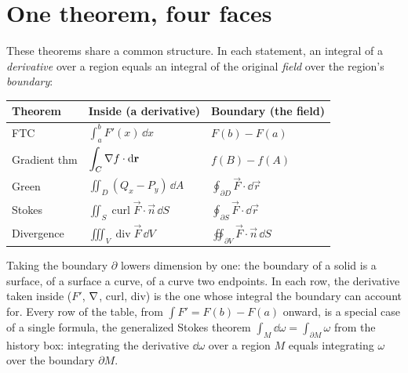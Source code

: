 \section{One theorem, four faces}
\label{ch35:unification}

These theorems share a common structure. In each statement, an integral of a
\emph{derivative} over a region equals an integral of the original \emph{field}
over the region's \emph{boundary}:

\begin{center}
\renewcommand{\arraystretch}{1.6}
\begin{tabular}{@{}lll@{}}
\toprule
\textbf{Theorem} & \textbf{Inside (a derivative)} & \textbf{Boundary (the field)} \\
\midrule
FTC & $\displaystyle\int_a^b F'(x)\,\dd x$ & $F(b)-F(a)$ \\
Gradient thm & $\displaystyle\int_C \nabla f\cdot\mathrm{d}\mathbf{r}$ & $f(B)-f(A)$ \\
Green & $\displaystyle\iint_D (Q_x-P_y)\,\dd A$ & $\displaystyle\oint_{\partial D}\vec F\cdot\dd\vec r$ \\
Stokes & $\displaystyle\iint_S \operatorname{curl}\vec F\cdot\vec n\,\dd S$ & $\displaystyle\oint_{\partial S}\vec F\cdot\dd\vec r$ \\
Divergence & $\displaystyle\iiint_V \operatorname{div}\vec F\,\dd V$ & $\displaystyle\oiint_{\partial V}\vec F\cdot\vec n\,\dd S$ \\
\bottomrule
\end{tabular}
\end{center}

\begin{aestheticbox}
Taking the boundary $\partial$ lowers dimension by one: the boundary of a solid is
a surface, of a surface a curve, of a curve two endpoints. In each row, the
derivative taken inside ($F'$, $\nabla$, curl, div) is the one whose integral the
boundary can account for. Every row of the table, from $\int F' = F(b)-F(a)$
onward, is a special case of a single formula, the generalized Stokes theorem
$\int_M \dd\omega = \int_{\partial M}\omega$ from the history box: integrating the
derivative $\dd\omega$ over a region $M$ equals integrating $\omega$ over the
boundary $\partial M$.
\end{aestheticbox}

